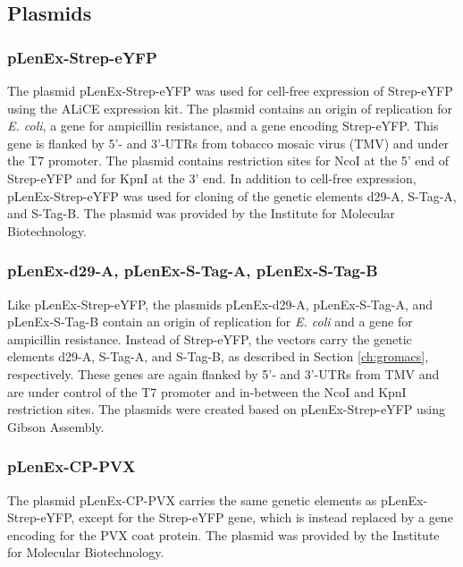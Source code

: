 \FloatBarrier

\subsection{Plasmids}
\subsubsection{pLenEx-Strep-eYFP}
The plasmid pLenEx-Strep-eYFP was used for cell-free expression of Strep-eYFP using the ALiCE\textsuperscript{\textregistered} expression kit. The plasmid contains an origin of replication for \emph{E. coli}, a gene for ampicillin resistance, and a gene encoding Strep-eYFP. This gene is flanked by 5'- and 3'-UTRs from tobacco mosaic virus (TMV) and under the T7 promoter. The plasmid contains restriction sites for NcoI at the 5' end of Strep-eYFP and for KpnI at the 3' end. In addition to cell-free expression, pLenEx-Strep-eYFP was used for cloning of the genetic elements d29-A, S-Tag-A, and S-Tag-B. The plasmid was provided by the Institute for Molecular Biotechnology.

\subsubsection{pLenEx-d29-A, pLenEx-S-Tag-A, pLenEx-S-Tag-B}
Like pLenEx-Strep-eYFP, the plasmids pLenEx-d29-A, pLenEx-S-Tag-A, and pLenEx-S-Tag-B contain an origin of replication for \emph{E. coli} and a gene for ampicillin resistance. Instead of Strep-eYFP, the vectors carry the genetic elements d29-A, S-Tag-A, and S-Tag-B, as described in Section \ref{ch:gromacs}, respectively. These genes are again flanked by 5'- and 3'-UTRs from TMV and are under control of the T7 promoter and in-between the NcoI and KpnI restriction sites. The plasmids were created based on pLenEx-Strep-eYFP using Gibson Assembly.


\subsubsection{pLenEx-CP-PVX}
The plasmid pLenEx-CP-PVX carries the same genetic elements as pLenEx-Strep-eYFP, except for the Strep-eYFP gene, which is instead replaced by a gene encoding for the PVX coat protein. The plasmid was provided by the Institute for Molecular Biotechnology.
\FloatBarrier
